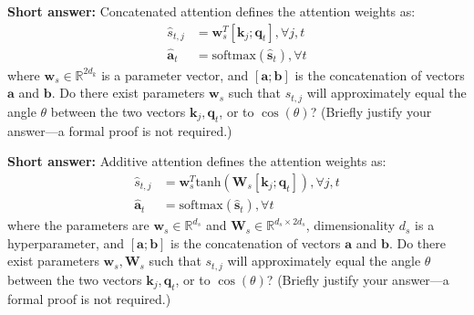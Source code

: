 \documentclass[11pt,addpoints,answers]{exam}
\newcommand{\Rb}{\mathbb{R}}
\newcommand{\av}{\mathbf{a}}
\newcommand{\bv}{\mathbf{b}}
\newcommand{\kv}{\mathbf{k}}
\newcommand{\qv}{\mathbf{q}}
\newcommand{\sv}{\mathbf{s}}
\newcommand{\wv}{\mathbf{w}}
\newcommand{\Wv}{\mathbf{W}}
\begin{document}
\begin{questions}
\begin{parts}
\begin{subparts}
    \subpart[2] \textbf{Short answer:} Concatenated attention defines the attention weights as:
    \begin{align*}
        \hat{s}_{t,j} &= \wv_s^T [ \kv_j ; \qv_t ], \forall j,t\\
        \hat{\av}_t &= \text{softmax}(\hat{\sv}_t), \forall t
    \end{align*}
    where $\wv_s \in \Rb^{2d_k}$ is a parameter vector, and $[\av; \bv]$ is the concatenation of vectors $\av$ and $\bv$.
    Do there exist parameters $\wv_s$ such that $s_{t,j}$ will approximately equal the angle $\theta$ between the two vectors $\kv_j,\qv_t$, or to $\cos(\theta)$? (Briefly justify your answer---a formal proof is not required.)

    \begin{answer_box}[title=,height=4cm,width=15cm]
    \end{answer_box}

\clearpage

    \subpart[2] \textbf{Short answer:} Additive attention defines the attention weights as:
    \begin{align*}
        \hat{s}_{t,j} &= \wv_s^T \text{tanh}(\Wv_s [ \kv_j ; \qv_t ]), \forall j,t\\
        \hat{\av}_t &= \text{softmax}(\hat{\sv}_t), \forall t
    \end{align*}
    where the parameters are $\wv_s \in \Rb^{d_s}$ and $\Wv_s \in \Rb^{d_s \times 2d_s}$, dimensionality $d_s$ is a hyperparameter, and $[\av; \bv]$ is the concatenation of vectors $\av$ and $\bv$.
    Do there exist parameters $\wv_s, \Wv_s$ such that $s_{t,j}$ will approximately equal the angle $\theta$ between the two vectors $\kv_j,\qv_t$, or to $\cos(\theta)$? (Briefly justify your answer---a formal proof is not required.)

    \begin{answer_box}[title=,height=4cm,width=15cm]
    \end{answer_box}

\end{subparts}



\end{parts}
\end{questions}
\end{document}
